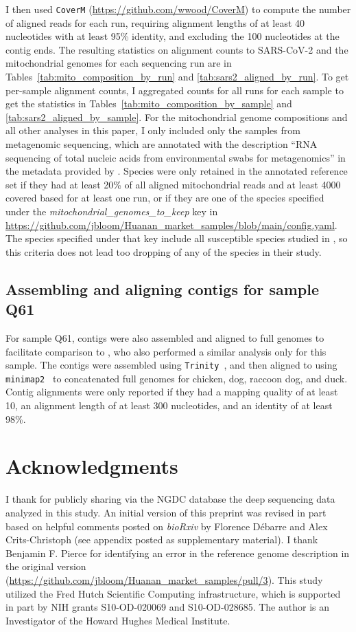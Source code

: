 \documentclass[9pt,twocolumn,twoside]{gsajnl_modified}
\begin{document}
{I then used \texttt{CoverM} (\url{https://github.com/wwood/CoverM}) to compute the number of aligned reads for each run, requiring alignment lengths of at least 40 nucleotides with at least 95\% identity, and excluding the 100 nucleotides at the contig ends.
The resulting statistics on alignment counts to SARS-CoV-2 and the mitochondrial genomes for each sequencing run are in Tables~\ref{tab:mito_composition_by_run} and \ref{tab:sars2_aligned_by_run}.
To get per-sample alignment counts, I aggregated counts for all runs for each sample to get the statistics in Tables~\ref{tab:mito_composition_by_sample} and \ref{tab:sars2_aligned_by_sample}.
For the mitochondrial genome compositions and all other analyses in this paper, I only included only the samples from metagenomic sequencing, which are annotated with the description ``RNA sequencing of total nucleic acids from environmental swabs for metagenomics'' in the metadata provided by \citet{liu2023surveillance}.
Species were only retained in the annotated reference set if they had at least 20\% of all aligned mitochondrial reads and at least 4000 covered based for at least one run, or if they are one of the species specified under the \textit{mitochondrial\_genomes\_to\_keep} key in \url{https://github.com/jbloom/Huanan_market_samples/blob/main/config.yaml}.
The species specified under that key include all susceptible species studied in \citet{crits2023genetic}, so this criteria does not lead too dropping of any of the species in their study.

\subsection{Assembling and aligning contigs for sample Q61}
For sample Q61, contigs were also assembled and aligned to full genomes to facilitate comparison to \citet{crits2023genetic}, who also performed a similar analysis only for this sample.
The contigs were assembled using \texttt{Trinity}~\citep{grabherr2011trinity}, and then aligned to using \texttt{minimap2}~\citep{li2018minimap2} to concatenated full genomes for chicken, dog, raccoon dog, and duck.
Contig alignments were only reported if they had a mapping quality of at least 10, an alignment length of at least 300 nucleotides, and an identity of at least 98\%.

\section{Acknowledgments}
I thank \citet{liu2023surveillance} for publicly sharing via the NGDC database the deep sequencing data analyzed in this study.
An initial version of this preprint was revised in part based on helpful comments posted on \textit{bioRxiv} by Florence Débarre and Alex Crits-Christoph (see appendix posted as supplementary material).
I thank Benjamin F. Pierce for identifying an error in the reference genome description in the original version (\url{https://github.com/jbloom/Huanan_market_samples/pull/3}).
This study utilized the Fred Hutch Scientific Computing infrastructure, which is supported in part by NIH grants S10-OD-020069 and S10-OD-028685.
The author is an Investigator of the Howard Hughes Medical Institute.

}
\end{document}
